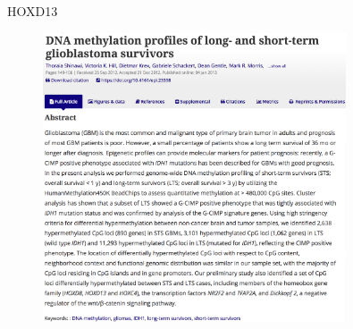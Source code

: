 \documentclass[slidestop,compress,11pt,xcolor=dvipsnames]{beamer}
\begin{document}
\begin{frame}{HOXD13}
 \begin{figure}[ht!]
  \centering
  \includegraphics[width=0.8\textwidth]{glioma/paper_HOXD13.png}
 \end{figure}
\end{frame}
\end{document}
